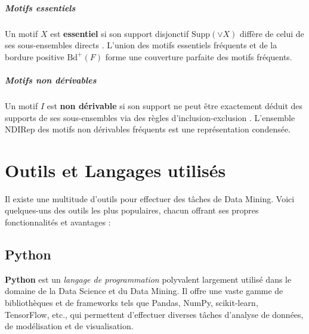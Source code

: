 \documentclass[a4paper,12pt]{report}
\begin{document}
        \paragraph{Motifs essentiels}
        
        Un motif \( X \) est \textbf{essentiel} si son support disjonctif \( \text{Supp}(\vee X) \) diffère de celui de ses sous-ensembles directs \cite{CCL05}. L’union des motifs essentiels fréquents et de la bordure positive \( \text{Bd}^+(F) \) forme une couverture parfaite des motifs fréquents.
        
        \paragraph{Motifs non dérivables}
        
        Un motif \( I \) est \textbf{non dérivable} si son support ne peut être exactement déduit des supports de ses sous-ensembles via des règles d’inclusion-exclusion \cite{CG06}. L’ensemble \( \text{NDIRep} \) des motifs non dérivables fréquents est une représentation condensée.
        
        

        


\chapter{Outils et Langages utilisés}
Il existe une multitude d’outils pour effectuer des tâches de Data Mining. Voici quelques-uns des outils les plus populaires, chacun offrant ses propres fonctionnalités et avantages :

    \section{Python}
    \textbf{Python} est un \emph{langage de programmation} polyvalent largement utilisé dans le domaine de la Data Science et du Data Mining. Il offre une vaste gamme de bibliothèques et de frameworks tels que Pandas, NumPy, scikit-learn, TensorFlow, etc., qui permettent d’effectuer diverses tâches d’analyse de données, de modélisation et de visualisation.
\end{document}
